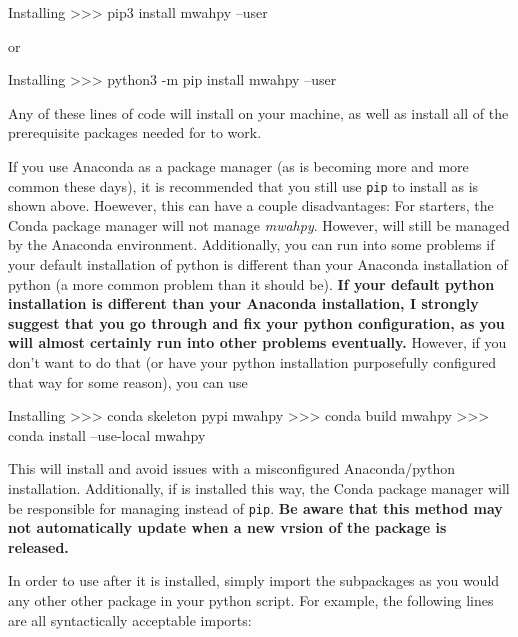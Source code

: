 \documentclass{article}
\begin{document}
\begin{codelisting}{Installing \mwahpy}
>>> pip3 install mwahpy --user
\end{codelisting}

or \\

\begin{codelisting}{Installing \mwahpy}
>>> python3 -m pip install mwahpy --user
\end{codelisting}

Any of these lines of code will install \mwahpy on your machine, as well as install all of the prerequisite packages needed for \mwahpy to work. 

If you use Anaconda as a package manager (as is becoming more and more common these days), it is recommended that you still use \verb!pip! to install \mwahpy as is shown above. Hoewever, this can have a couple disadvantages: For starters, the Conda package manager will not manage \textit{mwahpy}. However, \mwahpy will still be managed by the Anaconda environment. Additionally, you can run into some problems if your default installation of python is different than your Anaconda installation of python (a more common problem than it should be). \textbf{If your default python installation is different than your Anaconda installation, I strongly suggest that you go through and fix your python configuration, as you will almost certainly run into other problems eventually.} However, if you don't want to do that (or have your python installation purposefully configured that way for some reason), you can use \\

\begin{codelisting}{Installing \mwahpy}
>>> conda skeleton pypi mwahpy
>>> conda build mwahpy
>>> conda install --use-local mwahpy
\end{codelisting}

This will install \mwahpy and avoid issues with a misconfigured Anaconda/python installation. Additionally, if \mwahpy is installed this way, the Conda package manager will be responsible for managing \mwahpy instead of \verb!pip!. \textbf{Be aware that this method may not automatically update \mwahpy when a new vrsion of the package is released.} 

In order to use \mwahpy after it is installed, simply import the subpackages as you would any other other package in your python script. For example, the following lines are all syntactically acceptable imports: \\
\end{document}
